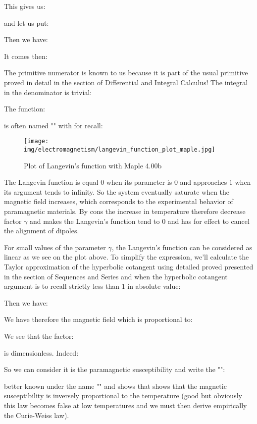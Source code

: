 	This gives us:
	
	and let us put:
	
	Then we have:
	
	It comes then:
	
	The primitive numerator is known to us because it is part of the usual primitive proved in detail in the section of Differential and Integral Calculus! The integral in the denominator is trivial:
	
	The function:
	
	is often named "" with for recall:
	
	\begin{figure}[H]
		\centering
		\texttt{[image: img/electromagnetism/langevin\_function\_plot\_maple.jpg]}
		\caption[]{Plot of Langevin's function with Maple 4.00b}
	\end{figure}
	The Langevin function is equal $0$ when its parameter is $0$ and approaches $1$ when its argument tends to infinity. So the system eventually saturate when the magnetic field increases, which corresponds to the experimental behavior of paramagnetic materials. By cons the increase in temperature therefore decrease factor $\gamma$ and makes the Langevin's function tend to $0$ and has for effect to cancel the alignment of dipoles.

	For small values of the parameter $\gamma$, the Langevin's function can be considered as linear as we see on the plot above.
	To simplify the expression, we'll calculate the Taylor approximation of the hyperbolic cotangent using detailed proved presented in the section of Sequences and Series and when the hyperbolic cotangent argument is to recall strictly less than $1$ in absolute value:
	
	Then we have:
	
	We have therefore the magnetic field which is proportional to:
	
	We see that the factor:
	
	is dimensionless. Indeed:
	
	So we can consider it is the paramagnetic susceptibility and write the "":
	
	better known under the name "" and shows that shows that the magnetic susceptibility is inversely proportional to the temperature (good but obviously this law becomes false at low temperatures and we must then derive empirically the Curie-Weiss law).
	
